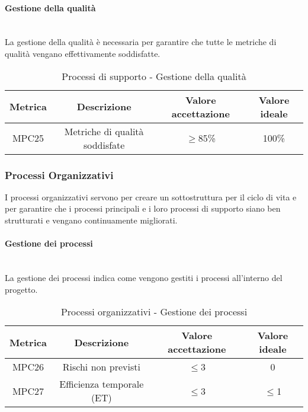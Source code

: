 \documentclass[10pt]{article}
\begin{document}
\begin{justify}
\newpage


\paragraph{Gestione della qualità}\mbox{}\\
La gestione della qualità è necessaria per garantire che tutte le metriche di qualità vengano effettivamente soddisfatte.\\
\begin{table}[H]
  \centering
\begin{tabular}{|c|c|c|c|}
  \hline
  \textbf{Metrica} & \textbf{Descrizione} & \textbf{Valore accettazione} & \textbf{Valore ideale}\\
  \hline
  MPC25 & Metriche di qualità soddisfate & $\geq$85\% & 100\% \\
  \hline
\end{tabular}
\caption{Processi di supporto - Gestione della qualità}
\label{tab:gestione della qualità}
\end{table}

\subsubsection{Processi Organizzativi}
I processi organizzativi servono per creare un sottostruttura per il ciclo di vita e
per garantire che i processi principali e i loro processi di supporto siano ben strutturati e vengano continuamente migliorati.\\
\paragraph{Gestione dei processi}\mbox{}\\
La gestione dei processi indica come vengono gestiti i processi all'interno del progetto.\\
\begin{table}[H]
  \centering
\begin{tabular}{|c|c|c|c|}
  \hline
  \textbf{Metrica} & \textbf{Descrizione} & \textbf{Valore accettazione} & \textbf{Valore ideale}\\
  \hline
  MPC26 & Rischi non previsti & $\leq$3 & 0 \\
  \hline
  MPC27 & Efficienza temporale (ET) & $\leq$3 & $\leq$1 \\
  \hline
\end{tabular}
\caption{Processi organizzativi - Gestione dei processi}
\label{tab:gestione dei processi}
\end{table}


\end{justify}
\end{document}
